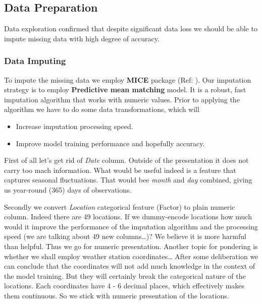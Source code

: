 \hypertarget{data-preparation}{%
\subsection{Data Preparation}\label{data-preparation}}

Data exploration confirmed that despite significant data loss we should
be able to impute missing data with high degree of accuracy.

\hypertarget{data-imputing}{%
\subsubsection{Data Imputing}\label{data-imputing}}

To impute the missing data we employ \textbf{MICE} package (Ref:
\cite{mice}). Our imputation strategy is to employ \textbf{Predictive
mean matching} model. It is a robust, fast imputation algorithm that
works with numeric values. Prior to applying the algorithm we have to do
some data transformations, which will

\begin{itemize}
\tightlist
\item
  Increase imputation processing speed.
\item
  Improve model training performance and hopefully accuracy.
\end{itemize}

First of all let's get rid of \emph{Date} column. Outside of the
presentation it does not carry too mach information. What would be
useful indeed is a feature that captures seasonal fluctuations. That
would bee \emph{month} and \emph{day} combined, giving us year-round
(365) days of observations.

Secondly we convert \emph{Location} categorical feature (Factor) to
plain numeric column. Indeed there are 49 locations. If we dummy-encode
locations how much would it improve the performance of the imputation
algorithm and the processing speed (we are talking about 49 new
columns\ldots{})? We believe it is more harmful than helpful. Thus we go
for numeric presentation. Another topic for pondering is whether we
shall employ weather station coordinates\ldots{} After some deliberation
we can conclude that the coordinates will not add much knowledge in the
context of the model training. But they will certainly break the
categorical nature of the locations. Each coordinates have 4 - 6 decimal
places, which effectively makes them continuous. So we stick with
numeric presentation of the locations.

